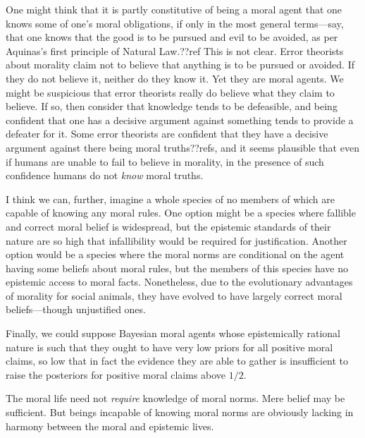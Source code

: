 One might think that it is partly constitutive of being a moral agent that one knows some of one's moral obligations, if 
only in the most general terms---say, that one knows that the good is to be pursued and evil to be avoided, as per 
Aquinas's first principle of Natural Law.??ref This is not clear. Error theorists about morality claim not to believe
that anything is to be pursued or avoided. If they do not believe it, neither do they know it. Yet they are moral agents.
We might be suspicious that error theorists really do believe what they claim to believe. If so, then consider that knowledge
tends to be defeasible, and being confident that one has a decisive argument against something tends to provide a defeater 
for it. Some error theorists are confident that they have a decisive argument against there being moral truths??refs, and it 
seems plausible that even if humans are unable to fail to believe in morality, in the presence of such confidence humans do 
not \textit{know} moral truths. 

I think we can, further, imagine a whole species of no members of which are capable of knowing any moral rules. 
One option might be a species where fallible and correct moral belief is widespread, but the epistemic standards of 
their nature are so high that infallibility would be required for justification. Another option would be a species 
where the moral norms are conditional on the agent having some beliefs about moral rules, but the members of this 
species have no epistemic access to moral facts. Nonetheless, due to the evolutionary advantages of morality for 
social animals, they have evolved to have largely correct moral beliefs---though unjustified ones. 

Finally, we could suppose Bayesian moral agents whose epistemically rational nature is such that they ought to have 
very low priors for all positive moral claims, so low that in fact the evidence they are able to gather is 
insufficient to raise the posteriors for positive moral claims above $1/2$. 

The moral life need not \textit{require} knowledge of moral norms. Mere belief may be sufficient. But beings incapable
of knowing moral norms are obviously lacking in harmony between the moral and epistemic lives. 

